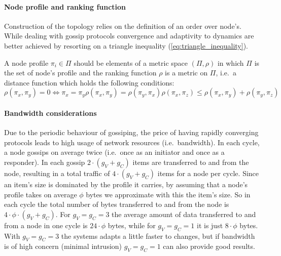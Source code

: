 \paragraph{Node profile and ranking function} Construction of the topology relies on the definition of an order over node's. While dealing with gossip protocols convergence and adaptivity to dynamics are better achieved by resorting on a triangle inequality (\ref{eq:triangle_inequality}).

A node profile $\pi_i \in \Pi$ should be elements of a metric space $(\Pi,\rho)$ in which $\Pi$ is the set of node's profile and the ranking function $\rho$ is a metric on $\Pi$, i.e.\ a distance function which holds the following conditions:
\begin{subequations}\label{eq:metric_space}
\begin{equation}
 \rho(\pi_x,\pi_y) = 0 \Leftrightarrow \pi_x = \pi_y
\end{equation}
\begin{equation}
 \rho(\pi_x,\pi_y) = \rho(\pi_y,\pi_x)
\end{equation}
\begin{equation}
 \rho(\pi_x,\pi_z) \leq \rho(\pi_x,\pi_y) + \rho(\pi_y,\pi_z)
\label{eq:triangle_inequality}
\end{equation}
\end{subequations}

\paragraph{\label{par:vicinity_bandwidth}Bandwidth considerations} Due to the periodic behaviour of gossiping, the price of having rapidly converging protocols leads to high usage of network resources (i.e.\ bandwidth). In each cycle, a node gossips on average twice (i.e.\ once as an initiator and once as a responder). In each gossip $2 \cdot (g_V+g_C)$ items are transferred to and from the node, resulting in a total traffic of $4 \cdot (g_V+g_C)$ items for a node per cycle. Since an item's size is dominated by the profile it carries, by assuming that a node's profile takes on average $\phi$ bytes we approximate with this the item's size. So in each cycle the total number of bytes transferred to and from the node is $4 \cdot \phi \cdot (g_V+g_C)$. For $g_V=g_C=3$ the average amount of data transferred to and from a node in one cycle is $24 \cdot \phi $ bytes, while for $g_V=g_C=1$ it is just $8 \cdot \phi$ bytes. With $g_V=g_C=3$ the systems adapts a little faster to changes, but if bandwidth is of high concern (minimal intrusion) $g_V=g_C=1$ can also provide good results.

